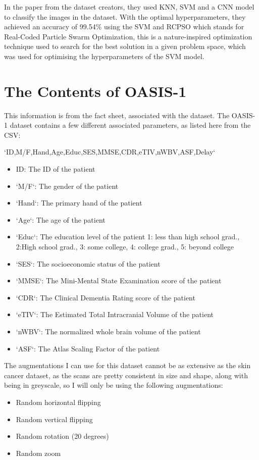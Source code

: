 \documentclass[]{final_report}
\begin{document}
In the paper from the dataset creators, they used KNN, SVM and a CNN model to classify the images in the dataset.
With the optimal hyperparameters, they achieved an accuracy of 99.54\% using the SVM and RCPSO which stands for Real-Coded Particle Swarm Optimization, this is a nature-inspired optimization technique used to search for the best solution in a given problem space, which was used for optimising the hyperparameters of the SVM model.

\section{The Contents of OASIS-1}
This information is from the fact sheet, associated with the dataset. \cite{OASISFactSheet}
The OASIS-1 dataset contains a few different associated parameters, as listed here from the CSV:

`ID,M/F,Hand,Age,Educ,SES,MMSE,CDR,eTIV,nWBV,ASF,Delay`

\begin{itemize}
  \item ID: The ID of the patient
  \item `M/F`: The gender of the patient
  \item `Hand`: The primary hand of the patient
  \item `Age`: The age of the patient
  \item `Educ`: The education level of the patient 1: less than high school grad., 2:High school grad., 3: some college, 4: college grad., 5: beyond college
  \item `SES`: The socioeconomic status of the patient
  \item `MMSE`: The Mini-Mental State Examination score of the patient
  \item `CDR`: The Clinical Dementia Rating score of the patient
  \item `eTIV`: The Estimated Total Intracranial Volume of the patient
  \item `nWBV`: The normalized whole brain volume of the patient
  \item `ASF`: The Atlas Scaling Factor of the patient
\end{itemize}

The augmentations I can use for this dataset cannot be as extensive as the skin cancer dataset\cite{TAN2019105725}, as the scans are pretty consistent in size and shape, along with being in greyscale, so I will only be using the following augmentations:
\begin{itemize}
  \item Random horizontal flipping
  \item Random vertical flipping
  \item Random rotation (20 degrees)
  \item Random zoom
\end{itemize}
\end{document}
